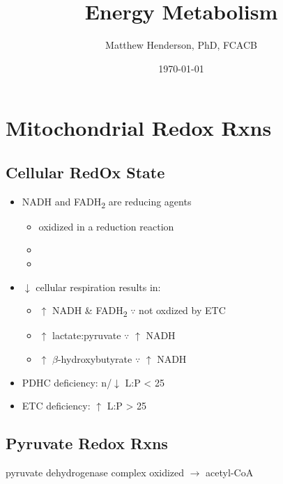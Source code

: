 \documentclass{scrartcl}
\author{Matthew Henderson, PhD, FCACB}
\date{\today}
\title{Energy Metabolism}
\begin{document}
\maketitle
\tableofcontents


\section{Mitochondrial Redox Rxns}
\label{sec:org38e221b}
\subsection{Cellular RedOx State}
\label{sec:orgf9bf086}
\begin{itemize}
\item NADH and FADH\textsubscript{2} are reducing agents
\begin{itemize}
\item oxidized in a reduction reaction
\item {}
\item {}
\end{itemize}
\item \(\downarrow\) cellular respiration results in:
\begin{itemize}
\item \(\uparrow\) NADH \& FADH\textsubscript{2} \(\because\) not oxdized by ETC
\item \(\uparrow\) lactate:pyruvate \(\because\) \(\uparrow\) NADH
\item \(\uparrow\) \(\beta\)-hydroxybutyrate  \(\because\) \(\uparrow\) NADH
\end{itemize}

\item PDHC deficiency: n/\(\downarrow\) L:P < 25
\item ETC deficiency: \(\uparrow\) L:P > 25
\end{itemize}

\subsection{Pyruvate Redox Rxns}
\label{sec:org35d184c}
\begin{description}
\item{pyruvate dehydrogenase complex} oxidized \(\to\) acetyl-CoA
\end{description}

\end{document}
